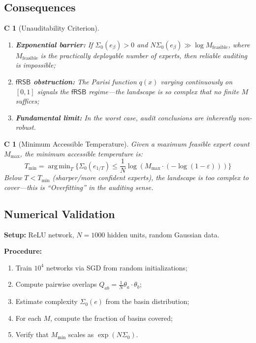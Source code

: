 \documentclass[12pt,a4paper]{article}
\newtheorem{corollary}[theorem]Corollary
\newcommand{\fRSB}{\mathsf{fRSB}}
\DeclareMathOperator*{\argmin}{arg\,min}
\begin{document}
\subsection{Consequences}
\begin{corollary}[Unauditability Criterion]\label{cor:unauditable}
\begin{enumerate}[label=(\arabic*)]
    \item \textbf{Exponential barrier:} If \(\Sigma_0(e_\beta) > 0\) and \(N \Sigma_0(e_\beta) \gg \log M_{\text{feasible}}\), where \(M_{\text{feasible}}\) is the practically deployable number of experts, then reliable auditing is impossible;
    \item \textbf{\(\fRSB\) obstruction:} The Parisi function \(q(x)\) varying continuously on \([0,1]\) signals the \(\fRSB\) regime---the landscape is so complex that no finite \(M\) suffices;
    \item \textbf{Fundamental limit:} In the worst case, audit conclusions are inherently non-robust.
\end{enumerate}
\end{corollary}

\begin{corollary}[Minimum Accessible Temperature]\label{cor:min_temp}
Given a maximum feasible expert count \(M_{\max}\), the minimum accessible temperature is:
\begin{equation}
T_{\min} = \argmin_T \{ \Sigma_0(e_{1/T}) \leq \frac{1}{N} \log (M_{\max} \cdot (-\log(1-\varepsilon))) \}
\end{equation}
Below \(T < T_{\min}\) (sharper/more confident experts), the landscape is too complex to cover---this is ``Overfitting'' in the auditing sense.
\end{corollary}

\subsection{Numerical Validation}
\textbf{Setup:} ReLU network, \(N = 1000\) hidden units, random Gaussian data.

\textbf{Procedure:}
\begin{enumerate}
    \item Train \(10^4\) networks via SGD from random initializations;
    \item Compute pairwise overlaps \(Q_{ab} = \frac{1}{N}\theta_a \cdot \theta_b\);
    \item Estimate complexity \(\Sigma_0(e)\) from the basin distribution;
    \item For each \(M\), compute the fraction of basins covered;
    \item Verify that \(M_{\min}\) scales as \(\exp(N\Sigma_0)\).
\end{enumerate}
\end{document}
